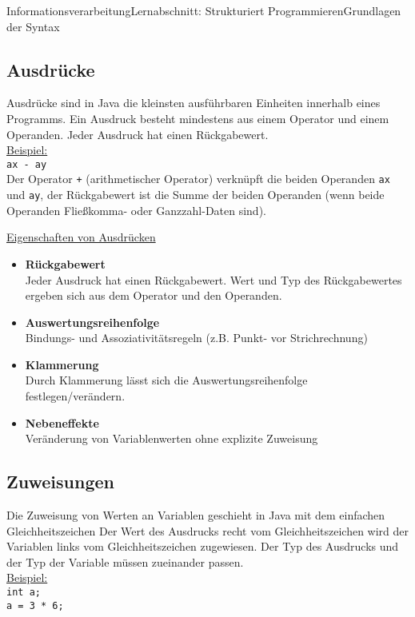 \documentclass[11pt,oneside,openany,headings=optiontotoc,11pt,numbers=noenddot]{article}
\begin{document}
\begin{worksheet}{Informationsverarbeitung}{Lernabschnitt: Strukturiert Programmieren}{Grundlagen der Syntax}
		\subsection{Ausdrücke}
		Ausdrücke sind in Java die kleinsten ausführbaren Einheiten innerhalb eines Programms. Ein Ausdruck besteht mindestens aus einem Operator und einem Operanden. Jeder Ausdruck hat einen Rückgabewert.\\
		\underline{Beispiel:}\\
		\lstinline[style=JavaInputStyle]|ax - ay|\\
		Der Operator \lstinline[style=JavaInputStyle]|+| (arithmetischer Operator) verknüpft die beiden Operanden \lstinline[style=JavaInputStyle]|ax| und \lstinline[style=JavaInputStyle]|ay|, der Rückgabewert ist die Summe der beiden Operanden (wenn beide Operanden Fließkomma- oder Ganzzahl-Daten sind).\\
		\par\noindent
		\underline{Eigenschaften von Ausdrücken}
		\begin{itemize}
			\item \textbf{Rückgabewert}\\
			Jeder Ausdruck hat einen Rückgabewert. Wert und Typ des Rückgabewertes ergeben sich aus dem Operator und den Operanden.
			\item \textbf{Auswertungsreihenfolge}\\
			Bindungs- und Assoziativitätsregeln (z.B. \grqq{}Punkt- vor Strichrechnung\grqq{})
			\item \textbf{Klammerung}\\
			Durch Klammerung lässt sich die Auswertungsreihenfolge festlegen/verändern.
			\item \textbf{Nebeneffekte}\\
			Veränderung von Variablenwerten ohne explizite Zuweisung
		\end{itemize}
		\subsection{Zuweisungen}
		Die Zuweisung von Werten an Variablen geschieht in Java mit dem einfachen Gleichheitszeichen Der Wert des Ausdrucks recht vom Gleichheitszeichen wird der Variablen links vom Gleichheitszeichen zugewiesen. Der Typ des Ausdrucks und der Typ der Variable müssen zueinander passen.\\
		\underline{Beispiel:}\\
		\lstinline[style=JavaInputStyle]|int a;|\\
		\lstinline[style=JavaInputStyle]|a = 3 * 6;|

\end{worksheet}
\end{document}

